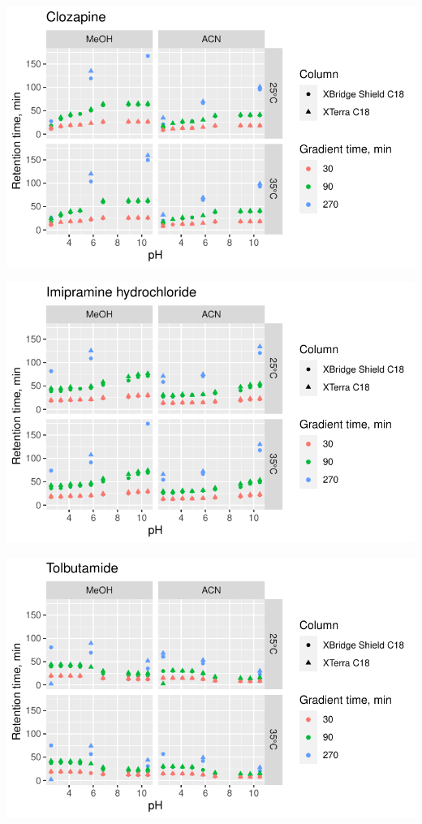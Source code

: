 \documentclass[
  letterpaper,
  DIV=11,
  numbers=noendperiod]{scrreprt}
\begin{document}
\includegraphics{index_files/figure-pdf/unnamed-chunk-4-18.pdf}

\includegraphics{index_files/figure-pdf/unnamed-chunk-4-19.pdf}

\includegraphics{index_files/figure-pdf/unnamed-chunk-4-20.pdf}
\end{document}
